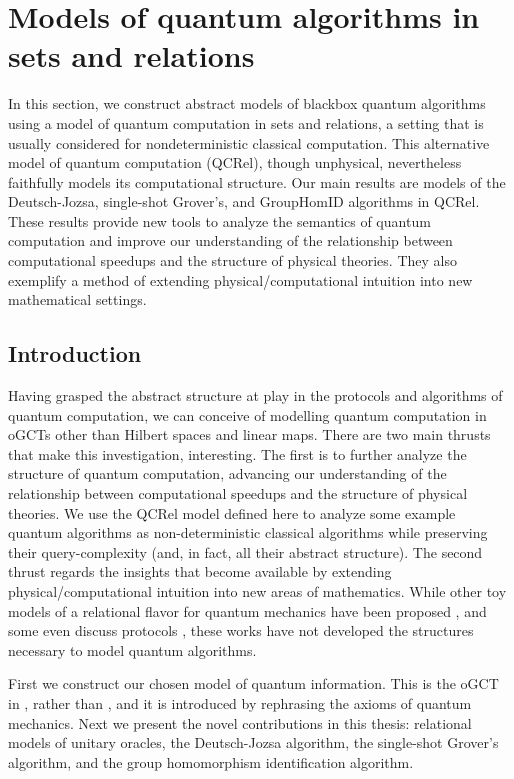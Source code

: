 \section{Models of quantum algorithms in sets and relations}
\label{sec:qalgrel}

        In this section, we construct abstract models of blackbox quantum algorithms using a model of quantum computation in sets and relations, a setting that is usually considered for nondeterministic classical computation.  This alternative model of quantum computation (QCRel), though unphysical, nevertheless faithfully models its computational structure.  Our main results are models of the Deutsch-Jozsa, single-shot Grover's, and GroupHomID algorithms in QCRel. These results provide new tools to analyze the semantics of quantum computation and improve our understanding of the relationship between computational speedups and the structure of physical theories. They also exemplify a method of extending physical/computational intuition into new mathematical settings.

\subsection{Introduction}

Having grasped the abstract structure at play in the protocols and algorithms of quantum computation, we can conceive of modelling quantum computation in oGCTs other than Hilbert spaces and linear maps.  There are two main thrusts that make this investigation, interesting.  The first is to further analyze the structure of quantum computation, advancing our understanding of the relationship between computational speedups and the structure of physical theories. We use the QCRel model defined here to analyze some example quantum algorithms as non-deterministic classical algorithms while preserving their query-complexity (and, in fact, all their abstract structure). The second thrust regards the insights that become available by extending physical/computational intuition into new areas of mathematics. While other toy models of a relational flavor for quantum mechanics have been proposed \cite{ellermanModelQM,discreteQT,modalQT,spekk}, and some even discuss protocols \cite{QCFF_James}, these works have not developed the structures necessary to model quantum algorithms.

First we construct our chosen model of quantum information.  This is the oGCT in , rather than , and it is introduced by rephrasing the axioms of quantum mechanics. Next we present the novel contributions in this thesis: relational models of unitary oracles, the Deutsch-Jozsa algorithm, the single-shot Grover's algorithm, and the group homomorphism identification algorithm.

